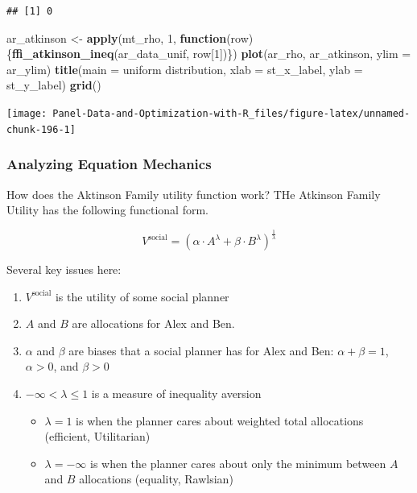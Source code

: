 \documentclass[
]{book}
\newenvironment{Shaded}{\begin{snugshade}}{\end{snugshade}}
\newcommand{\ControlFlowTok}[1]{\textcolor[rgb]{0.13,0.29,0.53}{\textbf{#1}}}
\newcommand{\DataTypeTok}[1]{\textcolor[rgb]{0.13,0.29,0.53}{#1}}
\newcommand{\DecValTok}[1]{\textcolor[rgb]{0.00,0.00,0.81}{#1}}
\newcommand{\KeywordTok}[1]{\textcolor[rgb]{0.13,0.29,0.53}{\textbf{#1}}}
\newcommand{\NormalTok}[1]{#1}
\newcommand{\StringTok}[1]{\textcolor[rgb]{0.31,0.60,0.02}{#1}}
\providecommand{\tightlist}{%
  \setlength{\itemsep}{0pt}\setlength{\parskip}{0pt}}
\begin{document}
\begin{verbatim}
## [1] 0
\end{verbatim}

\begin{Shaded}
\begin{Highlighting}[]
\NormalTok{ar\_atkinson \textless{}{-}}\StringTok{ }\KeywordTok{apply}\NormalTok{(mt\_rho, }\DecValTok{1}\NormalTok{, }\ControlFlowTok{function}\NormalTok{(row)\{}\KeywordTok{ffi\_atkinson\_ineq}\NormalTok{(ar\_data\_unif, row[}\DecValTok{1}\NormalTok{])\})}
\KeywordTok{plot}\NormalTok{(ar\_rho, ar\_atkinson, }\DataTypeTok{ylim =}\NormalTok{ ar\_ylim)}
\KeywordTok{title}\NormalTok{(}\DataTypeTok{main =} \StringTok{\textquotesingle{}uniform distribution\textquotesingle{}}\NormalTok{, }\DataTypeTok{xlab =}\NormalTok{ st\_x\_label, }\DataTypeTok{ylab =}\NormalTok{ st\_y\_label)}
\KeywordTok{grid}\NormalTok{()}
\end{Highlighting}
\end{Shaded}

\begin{center}\texttt{[image: Panel-Data-and-Optimization-with-R\_files/figure-latex/unnamed-chunk-196-1]} \end{center}

\hypertarget{analyzing-equation-mechanics}{%
\subsubsection{Analyzing Equation Mechanics}\label{analyzing-equation-mechanics}}

How does the Aktinson Family utility function work? THe Atkinson Family Utility has the following functional form.

\[
V^{\text{social}}
=
\left(
\alpha
\cdot
A^{\lambda}
+
\beta
\cdot
B^{\lambda}
\right)^{\frac{1}{\lambda}}
\]

Several key issues here:

\begin{enumerate}
\def\labelenumi{\arabic{enumi}.}
\tightlist
\item
  \(V^{\text{social}}\) is the utility of some social planner
\item
  \(A\) and \(B\) are allocations for Alex and Ben.
\item
  \(\alpha\) and \(\beta\) are biases that a social planner has for Alex and Ben: \(\alpha+\beta=1\), \(\alpha>0\), and \(\beta>0\)
\item
  \(-\infty < \lambda \le 1\) is a measure of inequality aversion

  \begin{itemize}
  \tightlist
  \item
    \(\lambda=1\) is when the planner cares about weighted total allocations (efficient, Utilitarian)
  \item
    \(\lambda=-\infty\) is when the planner cares about only the minimum between \(A\) and \(B\) allocations (equality, Rawlsian)
  \end{itemize}
\end{enumerate}
\end{document}
